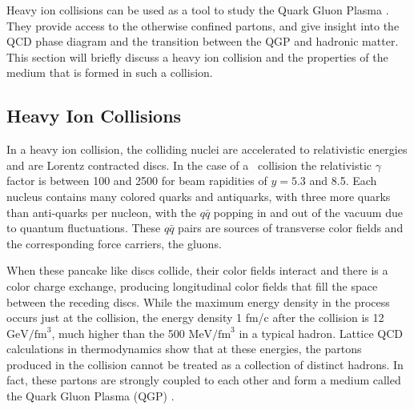 
Heavy ion collisions can be used as a tool to study the Quark Gluon Plasma \cite{SHURYAK198071} . They provide access to the otherwise confined partons, and give insight into the QCD phase diagram and the transition between the QGP and hadronic matter. This section will briefly discuss a heavy ion collision and the properties of the medium that is formed in such a collision.  

\subsection{Heavy Ion Collisions}
In a heavy ion collision, the colliding nuclei are accelerated to relativistic energies and are Lorentz contracted discs. In the case of a \pbpb\ collision the relativistic $\gamma$ factor is between 100 and 2500 for beam rapidities of $y = 5.3$ and 8.5. Each nucleus contains many colored quarks and antiquarks, with three more quarks than anti-quarks per nucleon, with the $q\bar{q}$ popping in and out of the vacuum due to quantum fluctuations. These $q\bar{q}$ pairs are sources of transverse color fields and the corresponding force carriers, the gluons. 

When these pancake like discs collide, their color fields interact and there is a color charge exchange, producing longitudinal color fields that fill the space between the receding discs. While the maximum energy density in the process occurs just at the collision, the energy density 1 fm/c after the collision is 12 $\mathrm{GeV} / \mathrm{fm}^3$, much higher than the 500 $\mathrm{MeV} / \mathrm{fm}^3$ in a typical hadron. Lattice QCD calculations in thermodynamics show that at these energies, the partons produced in the collision cannot be treated as a collection of distinct hadrons. In fact, these partons are strongly coupled to each other and form a medium called the Quark Gluon Plasma (QGP) \cite{???}. 


